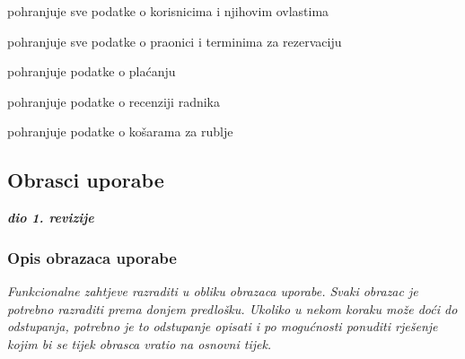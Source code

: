 \begin{packed_enum}
	\begin{packed_enum}
		
		\item pohranjuje sve podatke o korisnicima i njihovim ovlastima
		\item pohranjuje sve podatke o praonici i terminima za rezervaciju
		\item pohranjuje podatke o plaćanju
		\item pohranjuje podatke o recenziji radnika
		\item pohranjuje podatke o košarama za rublje
		
	\end{packed_enum}
	
\end{packed_enum}

\eject 



\subsection{Obrasci uporabe}

\textbf{\textit{dio 1. revizije}}

\subsubsection{Opis obrazaca uporabe}
\textit{Funkcionalne zahtjeve razraditi u obliku obrazaca uporabe. Svaki obrazac je potrebno razraditi prema donjem predlošku. Ukoliko u nekom koraku može doći do odstupanja, potrebno je to odstupanje opisati i po mogućnosti ponuditi rješenje kojim bi se tijek obrasca vratio na osnovni tijek.}\\


